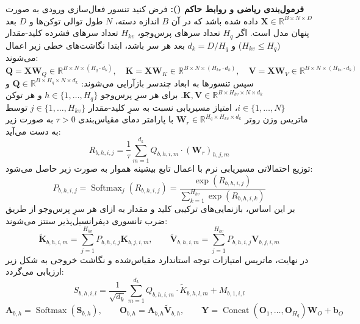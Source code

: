 \textbf{فرمول‌بندی ریاضی و روابط حاکم ():}
فرض کنید تنسور فعال‌سازی ورودی به صورت $\mathbf{X} \in \mathbb{R}^{B \times N \times D}$ داده شده باشد که در آن $B$ اندازه دسته، $N$ طول توالی توکن‌ها و $D$ بعد پنهان مدل است. اگر $H_q$ تعداد سرهای پرس‌وجو، $H_{kv}$ تعداد سرهای فشرده کلید-مقدار ($H_{kv} \le H_q$) و $d_k = D / H_q$ بعد هر سر باشد، ابتدا نگاشت‌های خطی زیر اعمال می‌شوند:
\begin{equation}
\mathbf{Q} = \mathbf{X} \mathbf{W}_Q \in \mathbb{R}^{B \times N \times (H_q \cdot d_k)}, \quad
\mathbf{K} = \mathbf{X} \mathbf{W}_K \in \mathbb{R}^{B \times N \times (H_{kv} \cdot d_k)}, \quad
\mathbf{V} = \mathbf{X} \mathbf{W}_V \in \mathbb{R}^{B \times N \times (H_{kv} \cdot d_k)}
\end{equation}
سپس تنسورها به ابعاد چندسر بازآرایی می‌شوند: $\mathbf{Q} \in \mathbb{R}^{B \times H_q \times N \times d_k}$ و $\mathbf{K}, \mathbf{V} \in \mathbb{R}^{B \times H_{kv} \times N \times d_k}$.
برای هر سرِ پرس‌وجو $h \in \{1, \dots, H_q\}$ و هر توکن $i \in \{1, \dots, N\}$، امتیاز مسیریابی نسبت به سرِ کلید-مقدار $j \in \{1, \dots, H_{kv}\}$ توسط ماتریس وزن روتر $\mathbf{W}_r \in \mathbb{R}^{H_q \times H_{kv} \times d_k}$ با پارامتر دمای مقیاس‌بندی $\tau > 0$ به صورت زیر به دست می‌آید:
\begin{equation}
R_{b, h, i, j} = \frac{1}{\tau} \sum_{m=1}^{d_k} Q_{b, h, i, m} \cdot (\mathbf{W}_r)_{h, j, m}
\end{equation}
توزیع احتمالاتی مسیریابی نرم با اعمال تابع بیشینه هموار به صورت زیر حاصل می‌شود:
\begin{equation}
P_{b, h, i, j} = \operatorname{Softmax}_j (R_{b, h, i, j}) = \frac{\exp(R_{b, h, i, j})}{\sum_{k=1}^{H_{kv}} \exp(R_{b, h, i, k})}
\end{equation}
بر این اساس، بازنمایی‌های ترکیبی کلید و مقدار به ازای هر سرِ پرس‌وجو از طریق ضرب تانسوری دیفرانسیل‌پذیر سنتز می‌شوند:
\begin{equation}
\widetilde{\mathbf{K}}_{b, h, i, m} = \sum_{j=1}^{H_{kv}} P_{b, h, i, j} \mathbf{K}_{b, j, i, m}, \qquad
\widetilde{\mathbf{V}}_{b, h, i, m} = \sum_{j=1}^{H_{kv}} P_{b, h, i, j} \mathbf{V}_{b, j, i, m}
\end{equation}
در نهایت، ماتریس امتیازات توجه استاندارد مقیاس‌شده و نگاشت خروجی به شکل زیر ارزیابی می‌گردد:
\begin{equation}
S_{b, h, i, l} = \frac{1}{\sqrt{d_k}} \sum_{m=1}^{d_k} Q_{b, h, i, m} \cdot \widetilde{K}_{b, h, l, m} + M_{b, 1, i, l}
\end{equation}
\begin{equation}
\mathbf{A}_{b, h} = \operatorname{Softmax}(\mathbf{S}_{b, h}), \qquad \mathbf{O}_{b, h} = \mathbf{A}_{b, h} \widetilde{\mathbf{V}}_{b, h}, \qquad \mathbf{Y} = \operatorname{Concat}(\mathbf{O}_1, \dots, \mathbf{O}_{H_q}) \mathbf{W}_O + \mathbf{b}_O
\end{equation}


